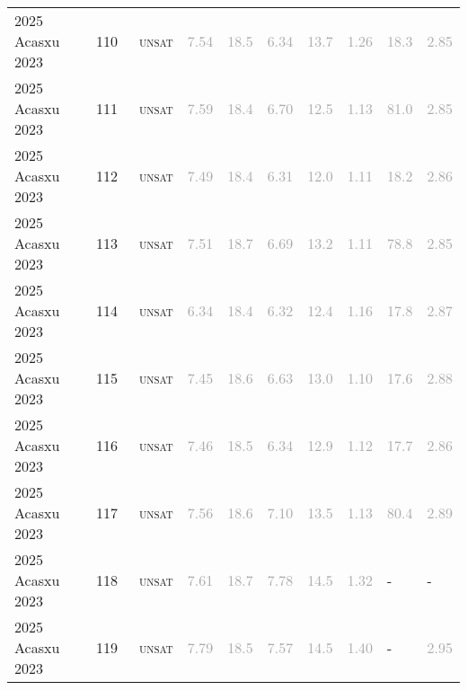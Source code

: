 \begin{center}
{\begin{longtable}{@{}llllllllll@{}}
2025 Acasxu 2023 & 110 & ~\textsc{unsat} & \textcolor{darkgray}{7.54} & \textcolor{darkgray}{18.5} & \textcolor{darkgray}{6.34} & \textcolor{darkgray}{13.7} & \textcolor{darkgray}{1.26} & \textcolor{darkgray}{18.3} & \textcolor{darkgray}{2.85} \\
2025 Acasxu 2023 & 111 & ~\textsc{unsat} & \textcolor{darkgray}{7.59} & \textcolor{darkgray}{18.4} & \textcolor{darkgray}{6.70} & \textcolor{darkgray}{12.5} & \textcolor{darkgray}{1.13} & \textcolor{darkgray}{81.0} & \textcolor{darkgray}{2.85} \\
2025 Acasxu 2023 & 112 & ~\textsc{unsat} & \textcolor{darkgray}{7.49} & \textcolor{darkgray}{18.4} & \textcolor{darkgray}{6.31} & \textcolor{darkgray}{12.0} & \textcolor{darkgray}{1.11} & \textcolor{darkgray}{18.2} & \textcolor{darkgray}{2.86} \\
2025 Acasxu 2023 & 113 & ~\textsc{unsat} & \textcolor{darkgray}{7.51} & \textcolor{darkgray}{18.7} & \textcolor{darkgray}{6.69} & \textcolor{darkgray}{13.2} & \textcolor{darkgray}{1.11} & \textcolor{darkgray}{78.8} & \textcolor{darkgray}{2.85} \\
2025 Acasxu 2023 & 114 & ~\textsc{unsat} & \textcolor{darkgray}{6.34} & \textcolor{darkgray}{18.4} & \textcolor{darkgray}{6.32} & \textcolor{darkgray}{12.4} & \textcolor{darkgray}{1.16} & \textcolor{darkgray}{17.8} & \textcolor{darkgray}{2.87} \\
2025 Acasxu 2023 & 115 & ~\textsc{unsat} & \textcolor{darkgray}{7.45} & \textcolor{darkgray}{18.6} & \textcolor{darkgray}{6.63} & \textcolor{darkgray}{13.0} & \textcolor{darkgray}{1.10} & \textcolor{darkgray}{17.6} & \textcolor{darkgray}{2.88} \\
2025 Acasxu 2023 & 116 & ~\textsc{unsat} & \textcolor{darkgray}{7.46} & \textcolor{darkgray}{18.5} & \textcolor{darkgray}{6.34} & \textcolor{darkgray}{12.9} & \textcolor{darkgray}{1.12} & \textcolor{darkgray}{17.7} & \textcolor{darkgray}{2.86} \\
2025 Acasxu 2023 & 117 & ~\textsc{unsat} & \textcolor{darkgray}{7.56} & \textcolor{darkgray}{18.6} & \textcolor{darkgray}{7.10} & \textcolor{darkgray}{13.5} & \textcolor{darkgray}{1.13} & \textcolor{darkgray}{80.4} & \textcolor{darkgray}{2.89} \\
2025 Acasxu 2023 & 118 & ~\textsc{unsat} & \textcolor{darkgray}{7.61} & \textcolor{darkgray}{18.7} & \textcolor{darkgray}{7.78} & \textcolor{darkgray}{14.5} & \textcolor{darkgray}{1.32} & - & - \\
2025 Acasxu 2023 & 119 & ~\textsc{unsat} & \textcolor{darkgray}{7.79} & \textcolor{darkgray}{18.5} & \textcolor{darkgray}{7.57} & \textcolor{darkgray}{14.5} & \textcolor{darkgray}{1.40} & - & \textcolor{darkgray}{2.95} \\

\end{longtable}}
\end{center}
